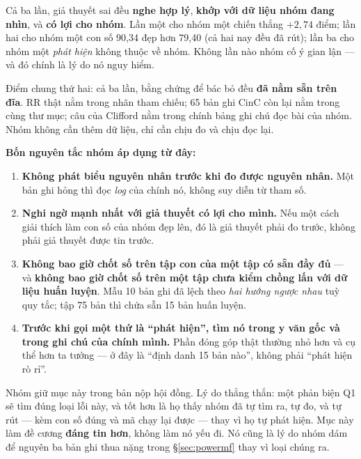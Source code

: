 \begin{ghichu}[title={Điểm chung của ba lần đoán sai --- và nguyên tắc nhóm rút ra}]
Cả ba lần, giả thuyết sai đều \textbf{nghe hợp lý}, \textbf{khớp với dữ liệu nhóm đang nhìn}, và
\textbf{có lợi cho nhóm}. Lần một cho nhóm một chiến thắng $+2{,}74$ điểm; lần hai cho nhóm một con số
90,34 đẹp hơn 79,40 (cả hai nay đều đã rút); lần ba cho nhóm một \textit{phát hiện} không thuộc về
nhóm. Không lần nào nhóm cố ý gian lận --- và đó chính là lý do nó nguy hiểm.

Điểm chung thứ hai: cả ba lần, bằng chứng để bác bỏ đều \textbf{đã nằm sẵn trên đĩa}. RR thật nằm trong
nhãn tham chiếu; 65 bản ghi CinC còn lại nằm trong cùng thư mục; câu của Clifford nằm trong chính bảng
ghi chú đọc bài của nhóm. Nhóm không cần thêm dữ liệu, chỉ cần chịu đo và chịu đọc lại.

\textbf{Bốn nguyên tắc nhóm áp dụng từ đây:}
\begin{enumerate}[leftmargin=1.6em,itemsep=3pt]
\item \textbf{Không phát biểu nguyên nhân trước khi đo được nguyên nhân.} Một bản ghi hỏng thì đọc
\textit{log} của chính nó, không suy diễn từ tham số.
\item \textbf{Nghi ngờ mạnh nhất với giả thuyết có lợi cho mình.} Nếu một cách giải thích làm con số của
nhóm đẹp lên, đó là giả thuyết phải đo trước, không phải giả thuyết được tin trước.
\item \textbf{Không bao giờ chốt số trên tập con của một tập có sẵn đầy đủ} --- và \textbf{không bao giờ
chốt số trên một tập chưa kiểm chồng lấn với dữ liệu huấn luyện}. Mẫu 10 bản ghi đã lệch theo
\textit{hai hướng ngược nhau} tuỳ quy tắc; tập 75 bản thì chứa sẵn 15 bản huấn luyện.
\item \textbf{Trước khi gọi một thứ là ``phát hiện'', tìm nó trong y văn gốc và trong ghi chú của chính
mình.} Phần đóng góp thật thường nhỏ hơn và cụ thể hơn ta tưởng --- ở đây là ``định danh 15 bản nào'',
không phải ``phát hiện rò rỉ''.
\end{enumerate}
\end{ghichu}

Nhóm giữ mục này trong bản nộp hội đồng. Lý do thẳng thắn: một phản biện Q1 sẽ tìm đúng loại lỗi này, và
tốt hơn là họ thấy nhóm đã tự tìm ra, tự đo, và tự rút --- kèm con số đúng và mã chạy lại được --- thay
vì họ tự phát hiện. Mục này làm đề cương \textbf{đáng tin hơn}, không làm nó yếu đi. Nó cũng là lý do
nhóm dám để nguyên ba bản ghi thua nặng trong \S\ref{sec:powermf} thay vì loại chúng ra.

